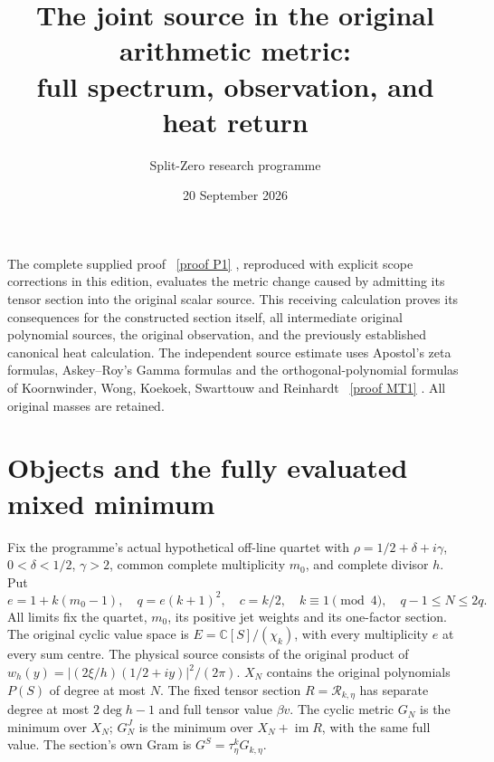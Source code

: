 \documentclass[11pt]{article}
\title{The joint source in the original arithmetic metric:\\full spectrum, observation, and heat return}
\author{Split-Zero research programme}
\date{20 September 2026}
\newcommand{\C}{\mathbb C}
\begin{document}
\maketitle
The complete supplied proof \cite{Input}%
~\href{https://github.com/KokunoYumeto/zeta-function-research-reader/blob/main/workbenches/splitzero-tandem/continuations/20260921-kernel-degree-steps/providers/SUPPLIED_PROOF_INTEGRATED.tex\#L49}{[proof P1]}%
{}, reproduced with explicit
scope corrections in this edition, evaluates the metric change caused by
admitting its tensor section into the original scalar source.
This receiving calculation proves its consequences for the constructed
section itself, all intermediate original polynomial sources, the original
observation, and the previously established canonical heat calculation.
The independent source estimate uses Apostol's zeta formulas,
Askey--Roy's Gamma formulas and the orthogonal-polynomial formulas of
Koornwinder, Wong, Koekoek, Swarttouw and Reinhardt
\cite{Apostol,Gamma,MP}%
~\href{https://github.com/KokunoYumeto/zeta-function-research-reader/blob/main/workbenches/splitzero-tandem/continuations/20260921-kernel-degree-steps/providers/OBSERVATION_COMPLETE_PROOFS.tex\#L1629}{[proof MT1]}%
{}. All original masses are retained.

\section{Objects and the fully evaluated mixed minimum}
Fix the programme's actual hypothetical off-line quartet with
$\rho=1/2+\delta+i\gamma$, $0<\delta<1/2$, $\gamma>2$, common complete
multiplicity $m_0$, and complete divisor $h$. Put
\[
 e=1+k(m_0-1),\quad q=e(k+1)^2,\quad c=k/2,\quad
 k\equiv1\pmod4,\quad q-1\le N\le2q.
 \tag{JM1}
\]
All limits fix the quartet, $m_0$, its positive jet weights and its
one-factor section. The original cyclic value space is
$E=\C[S]/(\chi_k)$, with every multiplicity $e$ at every sum centre.
The physical source consists of the original product of
$w_h(y)=|(2\xi/h)(1/2+iy)|^2/(2\pi)$.
$X_N$ contains the original polynomials $P(S)$ of degree at most $N$.
The fixed tensor section $R=\mathcal R_{k,\eta}$ has separate degree
at most $2\deg h-1$ and full tensor value $\beta v$.
The cyclic metric $G_N$ is the minimum over $X_N$; $G_N^J$ is the
minimum over $X_N+\operatorname{im}R$, with the same full value.
The section's own Gram is $G^S=\tau_\eta^kG_{k,\eta}$.
\end{document}
